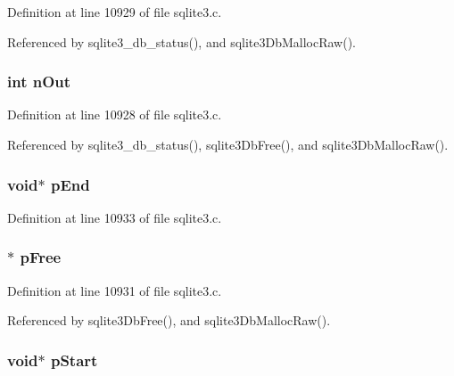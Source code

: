 Definition at line 10929 of file sqlite3.\+c.



Referenced by sqlite3\+\_\+db\+\_\+status(), and sqlite3\+Db\+Malloc\+Raw().

\hypertarget{struct_lookaside_a0267c0890971fec4298dbc1bb12a61c2}{}
\subsubsection[{n\+Out}]{\setlength{\rightskip}{0pt plus 5cm}int n\+Out}\label{struct_lookaside_a0267c0890971fec4298dbc1bb12a61c2}


Definition at line 10928 of file sqlite3.\+c.



Referenced by sqlite3\+\_\+db\+\_\+status(), sqlite3\+Db\+Free(), and sqlite3\+Db\+Malloc\+Raw().

\hypertarget{struct_lookaside_a7bf8b8d5988d9c99e8963fe07c9e41d1}{}
\subsubsection[{p\+End}]{\setlength{\rightskip}{0pt plus 5cm}void$\ast$ p\+End}\label{struct_lookaside_a7bf8b8d5988d9c99e8963fe07c9e41d1}


Definition at line 10933 of file sqlite3.\+c.

\hypertarget{struct_lookaside_a3f76935e48e387e3fa0bff445ba3d57e}{}
\subsubsection[{p\+Free}]{$\ast$ p\+Free}\label{struct_lookaside_a3f76935e48e387e3fa0bff445ba3d57e}


Definition at line 10931 of file sqlite3.\+c.



Referenced by sqlite3\+Db\+Free(), and sqlite3\+Db\+Malloc\+Raw().

\hypertarget{struct_lookaside_acad0645c70006ebafa3cb05e3679ce20}{}
\subsubsection[{p\+Start}]{\setlength{\rightskip}{0pt plus 5cm}void$\ast$ p\+Start}\label{struct_lookaside_acad0645c70006ebafa3cb05e3679ce20}


